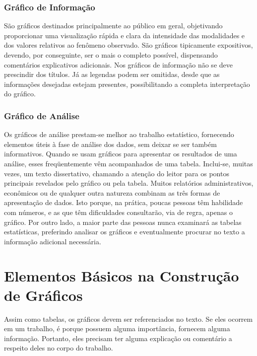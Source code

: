 \newpage
\subsubsection{Gráfico de Informação}

\inic São gráficos destinados principalmente ao público em geral, objetivando proporcionar uma visualização rápida e clara da intensidade das modalidades e dos valores relativos ao fenômeno observado. São gráficos tipicamente expositivos, devendo, por conseguinte, ser o mais o completo possível, dispensando comentários explicativos adicionais. Nos gráficos de informação não se deve prescindir dos títulos. Já as legendas podem ser omitidas, desde que as informações desejadas  estejam presentes, possibilitando a completa interpretação do gráfico.

\subsubsection{Gráfico de Análise}

\inic Os gráficos de análise prestam-se melhor ao trabalho estatístico, fornecendo elementos úteis à fase de análise dos dados, sem deixar se ser também informativos. Quando se usam gráficos para apresentar os resultados de uma análise, esses freqüentemente vêm acompanhados de uma tabela. Inclui-se, muitas vezes, um texto dissertativo, chamando a atenção do leitor para os pontos principais revelados pelo gráfico ou pela tabela. Muitos relatórios administrativos, econômicos ou de qualquer outra natureza combinam as três formas de apresentação de dados. Isto porque, na prática, poucas pessoas têm habilidade com números, e as que têm dificuldades consultarão, via de regra, apenas o gráfico. Por outro lado, a maior parte das pessoas nunca examinará as tabelas estatísticas, preferindo analisar os gráficos e eventualmente procurar no texto a informação adicional necessária.\vskip0.3cm




\section{Elementos  Básicos na Construção de Gráficos}

\inic Assim como tabelas, os gráficos devem ser referenciados no texto. Se eles ocorrem em um trabalho, é porque possuem alguma importância, fornecem alguma informação. Portanto, eles precisam ter alguma explicação ou comentário a respeito deles no corpo do trabalho.\vskip0.3cm 

